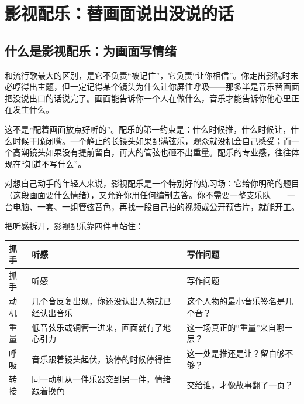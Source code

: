 \chapter{影视配乐：替画面说出没说的话}
\label{ch:genre-film-deep}


\section{什么是影视配乐：为画面写情绪}
\label{sec:film-what}

和流行歌最大的区别，是它不负责“被记住”，它负责“让你相信”。你走出影院时未必哼得出主题，但一定记得某个镜头为什么让你屏住呼吸——那多半是音乐替画面把没说出口的话说完了。画面能告诉你一个人在做什么，音乐才能告诉你他心里正在发生什么。

这不是“配着画面放点好听的”。配乐的第一约束是：什么时候推，什么时候让，什么时候干脆闭嘴。一个静止的长镜头如果配满弦乐，观众就没机会自己感受；而一个高潮镜头如果没有提前留白，再大的管弦也砸不出重量。配乐的专业感，往往体现在“知道不写什么”。

对想自己动手的年轻人来说，影视配乐是一个特别好的练习场：它给你明确的题目（这段画面要什么情绪），又允许你用任何编制去答。你不需要一整支乐队——一台电脑、一套、一组管弦音色，再找一段自己拍的视频或公开预告片，就能开工。

把听感拆开，影视配乐靠四件事站住：

\begin{longtable}{p{}p{}p{}}
\toprule
抓手 & 听感 & 写作问题 \\
\midrule
\endfirsthead
\toprule
抓手 & 听感 & 写作问题 \\
\midrule
\endhead
动机 & 几个音反复出现，你还没认出人物就已经认出音乐 & 这个人物的最小音乐签名是几个音？ \\
重量 & 低音弦乐或铜管一进来，画面就有了地心引力 & 这一场真正的“重量”来自哪一层？ \\
呼吸 & 音乐跟着镜头起伏，该停的时候停得住 & 这一处是推还是让？留白够不够？ \\
转接 & 同一动机从一件乐器交到另一件，情绪跟着换色 & 交给谁，才像故事翻了一页？ \\
\bottomrule
\end{longtable}

